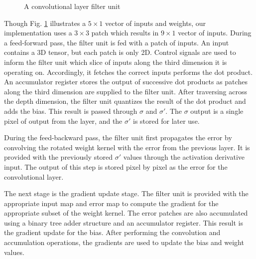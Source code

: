 \begin{figure}[ht]
	\caption{A convolutional layer filter unit}
	\label{fig:conv-filter-module}
\end{figure}

Though Fig. \ref{fig:conv-filter-module} illustrates a $5 \times 1$ vector of inputs and weights, our implementation uses a $3 \times 3$ patch which results in $9 \times 1$ vector of inputs. During a feed-forward pass, the filter unit is fed with a patch of inputs. An input contains a 3D tensor, but each patch is only 2D. Control signals are used to inform the filter unit which slice of inputs along the third dimension it is operating on. Accordingly, it fetches the correct inputs performs the dot product. An accumulator register stores the output of successive dot products as patches along the third dimension are supplied to the filter unit. After traversing across the depth dimension, the filter unit quantizes the result of the dot product and adds the bias. This result is passed through $\sigma$ and $\sigma'$. The $\sigma$ output is a single pixel of output from the layer, and the $\sigma'$ is stored for later use.

During the feed-backward pass, the filter unit first propagates the error by convolving the rotated weight kernel with the error from the previous layer. It is provided with the previously stored $\sigma'$ values through the activation derivative input. The output of this step is stored pixel by pixel as the error for the convolutional layer.

The next stage is the gradient update stage. The filter unit is provided with the appropriate input map and error map to compute the gradient for the appropriate subset of the weight kernel. The error patches are also accumulated using a binary tree adder structure and an accumulator register. This result is the gradient update for the bias. After performing the convolution and accumulation operations, the gradients are used to update the bias and weight values.

